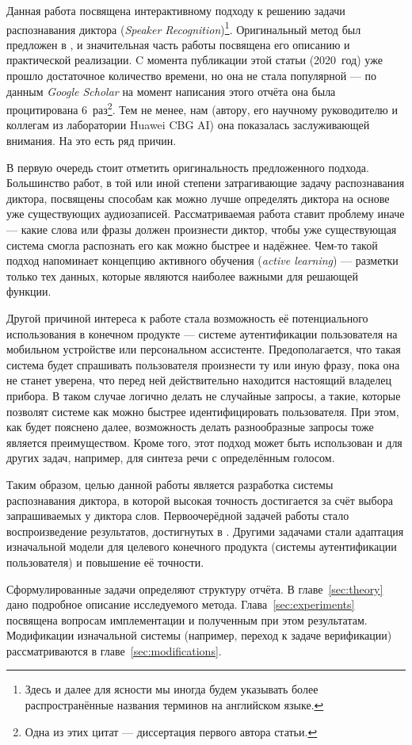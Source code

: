 Данная работа посвящена интерактивному подходу к решению задачи распознавания
диктора (\textit{Speaker Recognition})\footnote{
    Здесь и далее для ясности мы иногда будем указывать более распространённые
    названия терминов на английском языке.
}. Оригинальный метод был предложен в \citeisr, и значительная часть
работы посвящена его описанию и практической реализации. C момента публикации
этой статьи (2020~год) уже прошло достаточное количество времени, но она не
стала популярной --- по данным \textit{Google Scholar} на момент написания
этого отчёта она была процитирована 6~раз\footnote{
    Одна из этих цитат --- диссертация первого автора статьи.
}.
Тем не менее, нам (автору, его научному руководителю и коллегам из лаборатории
Huawei CBG AI) она показалась заслуживающей внимания. На это есть ряд причин.

В первую очередь стоит отметить оригинальность предложенного подхода.
Большинство работ, в той или иной степени затрагивающие задачу распознавания
диктора, посвящены способам как можно лучше определять диктора на основе уже
существующих аудиозаписей. Рассматриваемая работа ставит проблему иначе ---
какие слова или фразы должен произнести диктор, чтобы уже существующая система
смогла распознать его как можно быстрее и надёжнее. Чем-то такой подход
напоминает концепцию активного обучения (\textit{active learning}) --- разметки
только тех данных, которые являются наиболее важными для решающей функции.

Другой причиной интереса к работе стала возможность её потенциального
использования в конечном продукте --- системе аутентификации пользователя на
мобильном устройстве или персональном ассистенте. Предополагается, что такая
система будет спрашивать пользователя произнести ту или иную фразу, пока она не
станет уверена, что перед ней действительно находится настоящий владелец
прибора. В таком случае логично делать не случайные запросы, а такие, которые
позволят системе как можно быстрее идентифицировать пользователя. При этом, как
будет пояснено далее, возможность делать разнообразные запросы тоже является
преимуществом. Кроме того, этот подход может быть использован и для других
задач, например, для синтеза речи с определённым голосом.

Таким образом, целью данной работы является разработка системы распознавания
диктора, в которой высокая точность достигается за счёт выбора запрашиваемых
у диктора слов. Первоочерёдной задачей работы стало воспроизведение результатов,
достигнутых в \citeisr{}. Другими задачами стали адаптация изначальной модели
для целевого конечного продукта (системы аутентификации пользователя) и
повышение её точности.

Сформулированные задачи определяют структуру отчёта. В главе~\ref{sec:theory}
дано подробное описание исследуемого метода. Глава~\ref{sec:experiments}
посвящена вопросам имплементации и полученным при этом результатам. Модификации
изначальной системы (например, переход к задаче верификации) рассматриваются в
главе~\ref{sec:modifications}.
